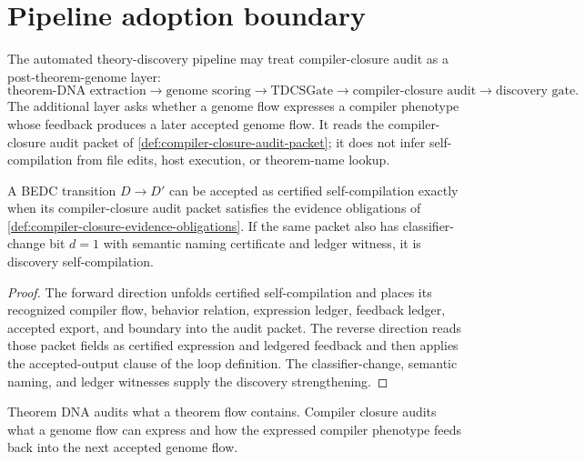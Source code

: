 \section{Pipeline adoption boundary}
\label{sec:compiler-closure-pipeline-boundary}

\begin{principle}
\label{prin:compiler-closure-adoption}
The automated theory-discovery pipeline may treat compiler-closure audit as a
post-theorem-genome layer:
$$
\text{theorem-DNA extraction}
\longrightarrow
\text{genome scoring}
\longrightarrow
\text{TDCSGate}
\longrightarrow
\text{compiler-closure audit}
\longrightarrow
\text{discovery gate}.
$$
The additional layer asks whether a genome flow expresses a compiler phenotype
whose feedback produces a later accepted genome flow. It reads the
compiler-closure audit packet of
\autoref{def:compiler-closure-audit-packet}; it does not infer
self-compilation from file edits, host execution, or theorem-name lookup.
\end{principle}

\begin{theorem}
\label{thm:compiler-closure-self-compilation-theorem}
A BEDC transition $D\to D'$ can be accepted as certified self-compilation
exactly when its compiler-closure audit packet satisfies the evidence
obligations of \autoref{def:compiler-closure-evidence-obligations}. If the
same packet also has classifier-change bit $d=1$ with semantic naming
certificate and ledger witness, it is discovery self-compilation.
\end{theorem}
\begin{proof}
The forward direction unfolds certified self-compilation and places its
recognized compiler flow, behavior relation, expression ledger, feedback
ledger, accepted export, and boundary into the audit packet. The reverse
direction reads those packet fields as certified expression and ledgered
feedback and then applies the accepted-output clause of the loop definition.
The classifier-change, semantic naming, and ledger witnesses supply the
discovery strengthening.
\end{proof}

\begin{principle}
\label{prin:compiler-closure-slogan}
Theorem DNA audits what a theorem flow contains. Compiler closure audits what
a genome flow can express and how the expressed compiler phenotype feeds back
into the next accepted genome flow.
\end{principle}

